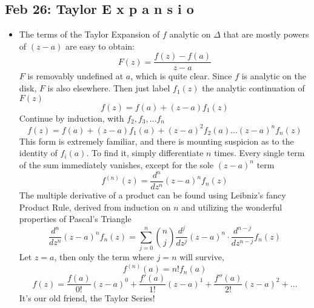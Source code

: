 \documentclass[10pt, oneside]{article}
\begin{document}
\subsection{Feb 26: Taylor E x p a n s i o}
\begin{itemize}
    \item The terms of the Taylor Expansion of $f$ analytic on $\Delta$ that are mostly powers of $(z-a)$ are easy to obtain:
        \[F(z) = \frac{f(z) - f(a)}{z-a}\]
        $F$ is removably undefined at $a$, which is quite clear. Since $f$ is analytic on the disk, $F$ is also elsewhere. Then just label $f_1(z)$ the analytic continuation of $F(z)$
        \[f(z) = f(a) + (z-a)f_1(z)\]
        Continue by induction, with $f_2, f_3, \hdots f_n$
        \[f(z) = f(a) + (z-a)f_1(a) + (z-a)^2f_2(a) \hdots (z-a)^nf_n(z)\]
        This form is extremely familiar, and there is mounting suspicion as to the identity of $f_i(a)$. To find it, simply differentiate $n$ times. Every single term of the sum immediately vanishes, except for the sole $(z-a)^n$ term
        \[f^{(n)}(z) = \frac{d^n}{dz^n} (z-a)^n f_n(z)\]
        The multiple derivative of a product can be found using Leibniz's fancy Product Rule, derived from induction on $n$ and utilizing the wonderful properties of Pascal's Triangle
        \[\frac{d^n}{dz^n} (z-a)^n f_n(z) = \sum_{j=0}^n \binom{n}{j} \frac{d^j}{dz^j} (z-a)^n \cdot \frac{d^{n-j}}{dz^{n-j}} f_n(z)\]
        Let $z=a$, then only the term where $j=n$ will survive,
        \[f^{(n)}(a) = n! f_n(a)\]
        \[f(z) = \frac{f(a)}{0!} (z-a)^0 + \frac{f'(a)}{1!} (z-a)^1 + \frac{f''(a)}{2!} (z-a)^2 + \hdots\]
        It's our old friend, the Taylor Series!
\end{itemize} 
\end{document}

